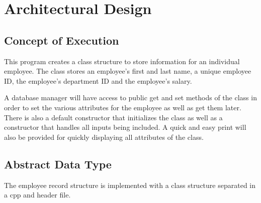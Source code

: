 \documentclass[12pt]{article}%
\begin{document}
\section{Architectural Design}
\subsection{Concept of Execution}
This program creates a class structure to store information for an
individual employee. The class stores an employee's first and last name,
a unique employee ID, the employee's department ID and the employee's salary.

A database manager will have access to public get and set methods of the class
in order to set the various attributes for the employee as well as get them later.
There is also a default constructor that initializes the class as well as a constructor
that handles all inputs being included. A quick and easy print will also be provided for quickly
displaying all attributes of the class.

\subsection{Abstract Data Type}
The employee record structure is implemented with a class structure separated in a cpp and header file.
\end{document}
